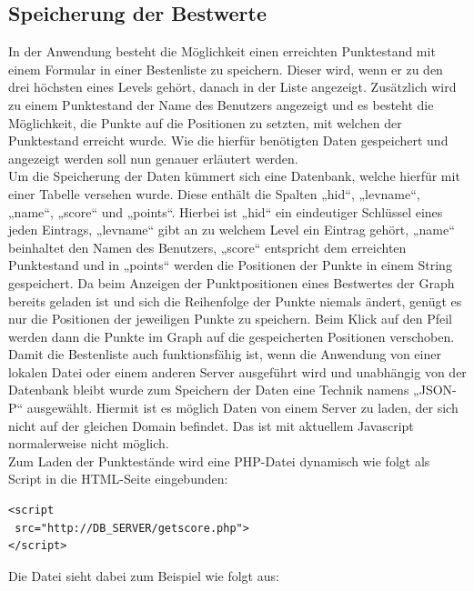 \documentclass[a4paper,twocolumn]{scrartcl}
\begin{document}
\subsection{Speicherung der Bestwerte}
In der Anwendung besteht die Möglichkeit einen erreichten Punktestand mit einem Formular in einer Bestenliste zu speichern. Dieser wird, wenn er zu den drei höchsten eines Levels gehört, danach in der Liste angezeigt. Zusätzlich wird zu einem Punktestand der Name des Benutzers angezeigt und es besteht die Möglichkeit, die Punkte auf die Positionen zu setzten, mit welchen der Punktestand erreicht wurde. Wie die hierfür benötigten Daten gespeichert und angezeigt werden soll nun genauer erläutert werden.\\
Um die Speicherung der Daten kümmert sich eine Datenbank, welche hierfür mit einer Tabelle versehen wurde. Diese enthält die Spalten „hid“, „levname“, „name“, „score“ und „points“. Hierbei ist „hid“ ein eindeutiger Schlüssel eines jeden Eintrags, „levname“ gibt an zu welchem Level ein Eintrag gehört, „name“ beinhaltet den Namen des Benutzers, „score“ entspricht dem erreichten Punktestand und in „points“ werden die Positionen der Punkte in einem String gespeichert. Da beim Anzeigen der Punktpositionen eines Bestwertes der Graph bereits geladen ist und sich die Reihenfolge der Punkte niemals ändert, genügt es nur die Positionen der jeweiligen Punkte zu speichern. Beim Klick auf den Pfeil werden dann die Punkte im Graph auf die gespeicherten Positionen verschoben.\\
Damit die Bestenliste auch funktionsfähig ist, wenn die Anwendung von einer lokalen Datei oder einem anderen Server ausgeführt wird und unabhängig von der Datenbank bleibt wurde zum Speichern der Daten eine Technik namens „JSON-P“ ausgewählt. Hiermit ist es möglich Daten von einem Server zu laden, der sich nicht auf der gleichen Domain befindet. Das ist mit aktuellem Javascript normalerweise nicht möglich.\\
Zum Laden der Punktestände wird eine PHP-Datei dynamisch wie folgt als Script in die HTML-Seite eingebunden:\\

\begin{lstlisting}
<script
 src="http://DB_SERVER/getscore.php">
</script>
\end{lstlisting}
Die Datei sieht dabei zum Beispiel wie folgt aus:
\end{document}

